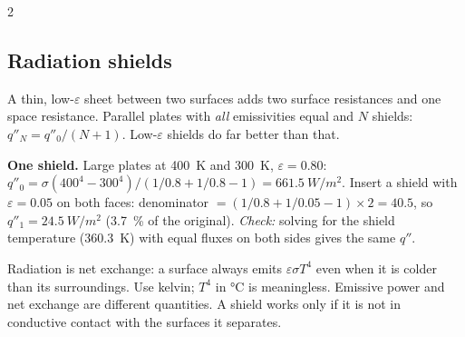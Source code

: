\begin{multicols}{2}
\subsection{Radiation shields}\label{sec:shields}
A thin, low-$\varepsilon$ sheet between two surfaces adds two surface resistances and one space resistance. Parallel plates with \emph{all} emissivities equal and $N$ shields: $q''_N=q''_0/(N+1)$. Low-$\varepsilon$ shields do far better than that.

\begin{demobox}\textbf{One shield.} Large plates at \SI{400}{K} and \SI{300}{K}, $\varepsilon=0.80$: $q''_0=\sigma(400^4-300^4)/(1/0.8+1/0.8-1)=\SI{661.5}{W/m^2}$. Insert a shield with $\varepsilon=0.05$ on both faces: denominator $=(1/0.8+1/0.05-1)\times2=40.5$, so $q''_1=\SI{24.5}{W/m^2}$ (\SI{3.7}{\percent} of the original). \emph{Check:} solving for the shield temperature (\SI{360.3}{K}) with equal fluxes on both sides gives the same $q''$.\end{demobox}

\begin{trapbox}Radiation is net exchange: a surface always emits $\varepsilon\sigma T^4$ even when it is colder than its surroundings. Use kelvin; $T^4$ in \si{\celsius} is meaningless. Emissive power and net exchange are different quantities. A shield works only if it is not in conductive contact with the surfaces it separates.\end{trapbox}
\end{multicols}
